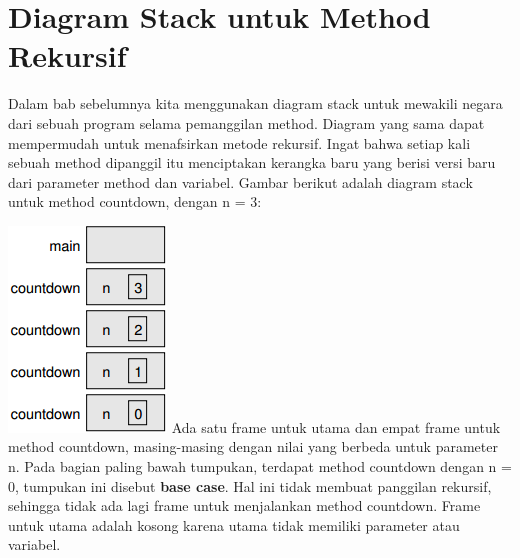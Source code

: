 \section{Diagram Stack untuk Method Rekursif}
 Dalam bab sebelumnya kita menggunakan diagram stack untuk mewakili negara dari sebuah program selama pemanggilan method. Diagram yang sama dapat mempermudah untuk menafsirkan metode rekursif. 
 \newline
 Ingat bahwa setiap kali sebuah method dipanggil itu menciptakan kerangka baru yang berisi versi baru dari parameter method dan variabel. 
 \newline
  \newline
 Gambar berikut adalah diagram stack untuk method countdown, dengan n = 3:
 \par
 \includegraphics{diagram}
 \newline
 \newline
 Ada satu frame untuk utama dan empat frame untuk method countdown, masing-masing dengan nilai yang berbeda untuk parameter n. Pada bagian paling bawah tumpukan, terdapat method countdown dengan n = 0, tumpukan ini disebut \textbf{base case}. Hal ini tidak membuat panggilan rekursif, sehingga tidak ada lagi frame untuk menjalankan method countdown. Frame untuk utama adalah kosong karena utama tidak memiliki parameter atau variabel.
 \newline
 \newline
